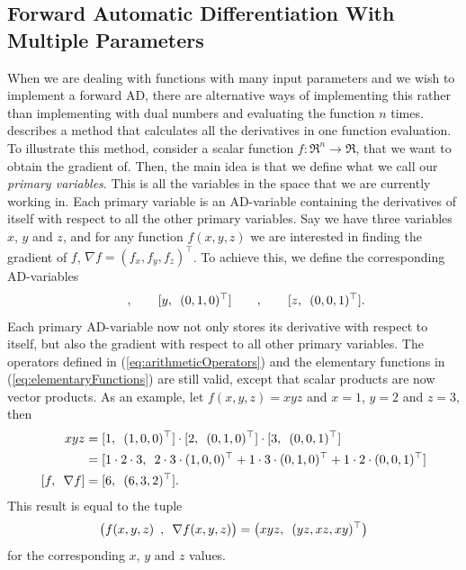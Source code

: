 \subsection{Forward Automatic Differentiation With Multiple Parameters}
When we are dealing with functions with many input parameters and we wish to implement a forward AD, there are alternative ways of implementing this rather than implementing with dual numbers and evaluating the function $n$ times.  \citet{doi:10.1137/080743627} describes a method that calculates all the derivatives in one function evaluation. To illustrate this method, consider a scalar function $f: \Re^n \rightarrow \Re$, that we want to obtain the gradient of. Then, the main idea is that we define what we call our \textit{primary variables}. This is all the variables in the space that we are currently working in. Each primary variable is an AD-variable containing the derivatives of itself with respect to all the other primary variables. Say we have three variables $x$, $y$ and $z$, and for any function $f(x,y,z)$ we are interested in finding the gradient of $f$, $\nabla f=(f_x, f_y, f_z)^\top$. To achieve this, we define the corresponding AD-variables
\begin{equation*}
    [\adpair{x}{(1,0,0)^\top}]\hspace{2em},\hspace{2em}
    [\adpair{y}{(0,1,0)^\top}]\hspace{2em},\hspace{2em}
    [\adpair{z}{(0,0,1)^\top}].
\end{equation*}
Each primary AD-variable now not only stores its derivative with respect to itself, but also the gradient with respect to all other primary variables. The operators defined in (\ref{eq:arithmeticOperators}) and the elementary functions in (\ref{eq:elementaryFunctions}) are still valid, except that scalar products are now vector products. As an example, let $f(x,y,z) = xyz$ and $x = 1$, $y = 2$ and $z = 3$, then
\begin{align*}
    xyz &= [\adpair{1}{(1,0,0)^\top}]\cdot [\adpair{2}{(0,1,0)^\top}]\cdot
    [\adpair{3}{(0,0,1)^\top}] \\
    &=[\adpair{1\cdot 2\cdot 3}{2\cdot3\cdot(1,0,0)^\top + 1\cdot3\cdot(0,1,0)^\top + 1\cdot2\cdot(0,0,1)^\top}] \\
    [\adpair{f}{\nabla f}] &= [\adpair{6}{(6,3,2)^\top}].
\end{align*}
This result is equal to the tuple
\begin{equation*}
    \big(f(x,y,z) \hspace{0.5em},\hspace{0.5em} \nabla f(x,y,z)\big) = \big(xyz ,\hspace{0.5em} (yz,xz,xy)^\top\big)
\end{equation*}
for the corresponding $x$, $y$ and $z$ values. 
